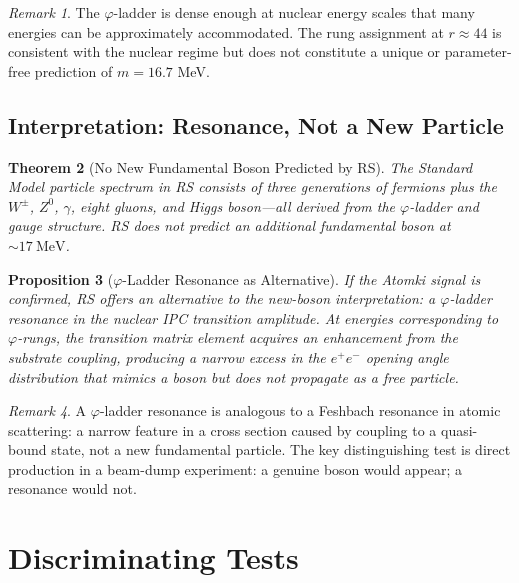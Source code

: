 \documentclass[12pt,a4paper]{article}
\newtheorem{theorem}{Theorem}[section]
\newtheorem{proposition}[theorem]{Proposition}
\theoremstyle{definition}
\theoremstyle{remark}
\newtheorem{remark}[theorem]{Remark}
\begin{document}
\begin{remark}
The $\varphi$-ladder is dense enough at nuclear energy scales that
many energies can be approximately accommodated.  The rung assignment
at $r \approx 44$ is consistent with the nuclear regime but does not
constitute a unique or parameter-free prediction of $m = 16.7$ MeV.
\end{remark}

\subsection{Interpretation: Resonance, Not a New Particle}

\begin{theorem}[No New Fundamental Boson Predicted by RS]
\label{thm:no-boson}
The Standard Model particle spectrum in RS consists of three generations
of fermions plus the $W^\pm$, $Z^0$, $\gamma$, eight gluons, and Higgs
boson---all derived from the $\varphi$-ladder and gauge structure.  RS
does not predict an additional fundamental boson at $\sim 17~\mathrm{MeV}$.
\end{theorem}

\begin{proposition}[$\varphi$-Ladder Resonance as Alternative]
\label{prop:resonance}
If the Atomki signal is confirmed, RS offers an alternative to the
new-boson interpretation: a \emph{$\varphi$-ladder resonance} in the
nuclear IPC transition amplitude.  At energies corresponding to
$\varphi$-rungs, the transition matrix element acquires an enhancement
from the substrate coupling, producing a narrow excess in the
$e^+e^-$ opening angle distribution that mimics a boson but does not
propagate as a free particle.
\end{proposition}

\begin{remark}
A $\varphi$-ladder resonance is analogous to a Feshbach resonance in
atomic scattering: a narrow feature in a cross section caused by
coupling to a quasi-bound state, not a new fundamental particle.
The key distinguishing test is direct production in a beam-dump
experiment: a genuine boson would appear; a resonance would not.
\end{remark}

\section{Discriminating Tests}
\label{sec:tests}
\end{document}
